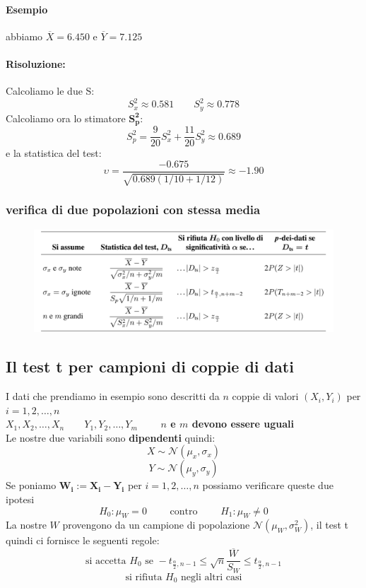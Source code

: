 \documentclass[]{article}
\begin{document}
    \paragraph{Esempio} abbiamo $\overline{X} = 6.450$ e $\overline{Y} = 7.125$
    \paragraph{Risoluzione:} Calcoliamo le due S:
    \[ S^2_x \approx 0.581 \qquad S^2_y \approx 0.778 \]
    Calcoliamo ora lo stimatore $\boldsymbol{S^2_p}$:
    \[ S^2_p = \frac{9}{20} S^2_x + \frac{11}{20} S^2_y \approx 0.689 \]
    e la statistica del test:
    \[ \upsilon = \frac{-0.675}{\sqrt{0.689 ( 1/10 + 1/12)}} \approx -1.90 \]
    \subsubsection{verifica di due popolazioni con stessa media}
    \begin{figure}[H]
        \includegraphics[width=\textwidth]{images/boh_10.png}
    \end{figure}
    \subsection{Il test t per campioni di coppie di dati}
    I dati che prendiamo in esempio sono descritti da $n$ coppie di valori $(X_i, Y_i)$ per $i = 1,2,\ldots, n$ \\
    $X_1, X_2, \ldots, X_n \qquad Y_1, Y_2, \ldots, Y_m \qquad$ \textbf{$n$ e $m$ devono essere uguali} \\ 
    Le nostre due variabili sono \textbf{dipendenti} quindi:
    \[ X \sim \mathcal{N}(\mu_x, \sigma_x) \]
    \[ Y \sim \mathcal{N}(\mu_y, \sigma_y) \]
    Se poniamo $\boldsymbol{W_i := X_i - Y_i}$ per $i=1,2,\ldots,n$ possiamo verificare queste due ipotesi
    \[ H_0 : \mu_W = 0 \qquad \text{ contro } \qquad H_1 : \mu_W \not = 0 \]
    La nostre $W$ provengono da un campione di popolazione $\mathcal{N}(\mu_W, \sigma^2_W)$, il test t quindi ci fornisce le seguenti regole:
    \[ \text{si accetta } H_0 \text{ se } - t_{\frac{\alpha}{2}, n-1} \leq \sqrt{n} \frac{\overline{W}}{S_W} \leq t_{\frac{\alpha}{2}, n-1} \]
    \[ \text{si rifiuta } H_0 \text{ negli altri casi} \]
\end{document}
